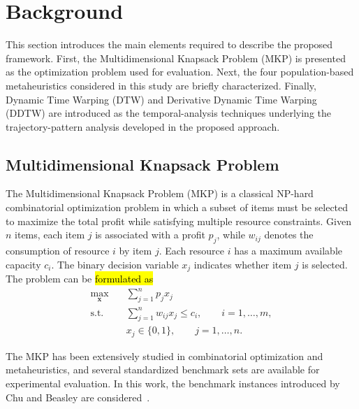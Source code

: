 \documentclass[mathematics,article,accept,moreauthors]{Definitions/mdpi}
\begin{document}
\section{Background}

This section introduces the main elements required to describe the proposed
framework. First, the Multidimensional Knapsack Problem (MKP) is presented as
the optimization problem used for evaluation. Next, the four population-based
metaheuristics considered in this study are briefly characterized. Finally,
Dynamic Time Warping (DTW) and Derivative Dynamic Time Warping (DDTW) are
introduced as the temporal-analysis techniques underlying the trajectory-pattern
analysis developed in the proposed approach.

\subsection{Multidimensional Knapsack Problem}

The Multidimensional Knapsack Problem (MKP) is a classical NP-hard
combinatorial optimization problem in which a subset of items must be selected
to maximize the total profit while satisfying multiple resource constraints.
Given $n$ items, each item $j$ is associated with a profit $p_j$, while
$w_{ij}$ denotes the consumption of resource $i$ by item $j$. Each resource
$i$ has a maximum available capacity $c_i$. The binary decision variable
$x_j$ indicates whether item $j$ is selected. The problem can be \hl{formulated
as} %
\begin{equation}
\begin{aligned}
\max_{\mathbf{x}} \quad
    & \sum_{j=1}^{n} p_j x_j \\
\text{s.t.} \quad
    & \sum_{j=1}^{n} w_{ij}x_j \leq c_i,
      \qquad i=1,\ldots,m, \\
    & x_j \in \{0,1\},
      \qquad j=1,\ldots,n.
\end{aligned}
\end{equation}

The MKP has been extensively studied in combinatorial optimization and
metaheuristics, and several standardized benchmark sets are available for
experimental evaluation. In this work, the benchmark instances introduced
by Chu and Beasley are considered~\cite{chu1998genetic}.
\end{document}
